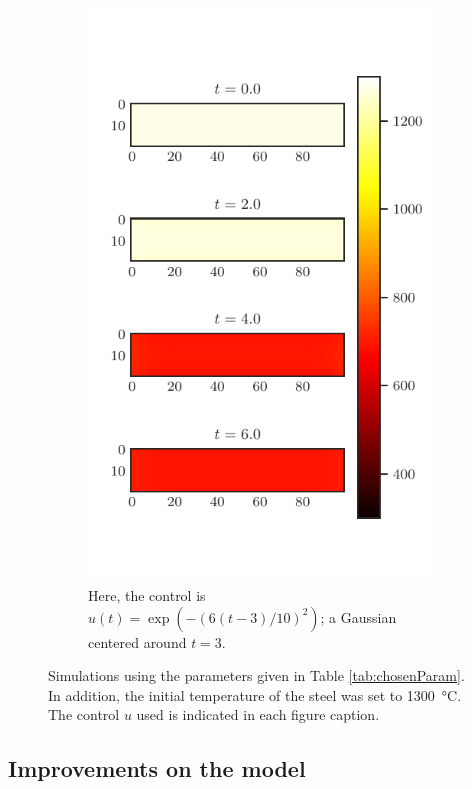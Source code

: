 \begin{figure}
{\begin{subfigure}[t]{3in}
        \includegraphics{figures/gaussian_u_state.pdf}
        \caption{Here, the control is $u(t) = \exp{\left(-\left(6(t-3)/10\right)^2\right)}$; a Gaussian centered around $t=3$.}
        \label{fig:state_simulations_b}
    \end{subfigure}
    }
    \caption{Simulations using the parameters given in Table \ref{tab:chosenParam}. In addition, the initial temperature of the steel was set to \SI{1300}{\celsius}. The control $u$ used is indicated in each figure caption.}
    \label{fig:state_simulations}
\end{figure}

\subsection{Improvements on the model}

